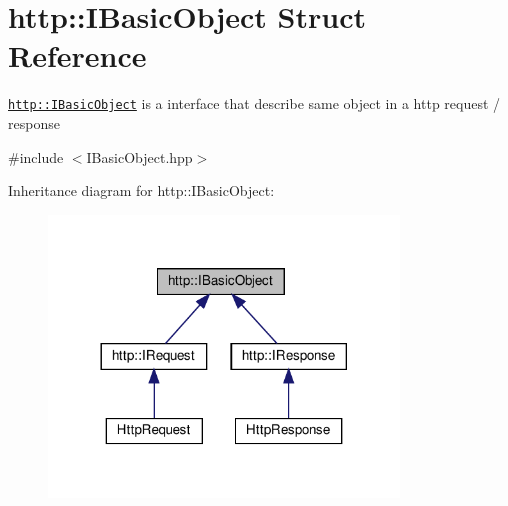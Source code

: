\hypertarget{structhttp_1_1IBasicObject}{}\section{http\+:\+:I\+Basic\+Object Struct Reference}
\label{structhttp_1_1IBasicObject}


\href{http::IBasicObject}{\tt http\+::\+I\+Basic\+Object} is a interface that describe same object in a http request / response  




{\ttfamily \#include $<$I\+Basic\+Object.\+hpp$>$}



Inheritance diagram for http\+:\+:I\+Basic\+Object\+:
\nopagebreak
\begin{figure}[H]
\begin{center}
\leavevmode
\includegraphics[width=264pt]{structhttp_1_1IBasicObject__inherit__graph}
\end{center}
\end{figure}
